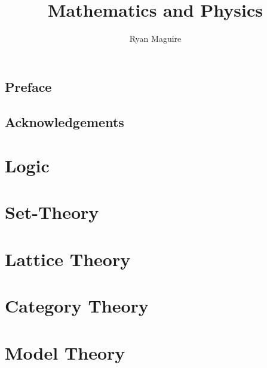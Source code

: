 \documentclass[oneside]{book}                                                  %
\title{Mathematics and Physics}                                                %
\author{Ryan Maguire}                                                          %
\date{\vspace{-5ex}}                                                           %
\newcommand*{\TOPPATH}{books}
\newcommand*{\PATH}{\TOPPATH/}
\newcounter{endpage}
\begin{document}
    \maketitle
    \tableofcontents
    \listoffigures
    \listoftables
    \clearpage
    \chapter*{Preface}
        
    \clearpage
    \chapter*{Acknowledgements}
        
    \clearpage

        \label{book:Foundations}
        \renewcommand{\PATH}{\TOPPATH/Foundations}
        \part{Logic}
            
        \part{Set-Theory}
            
        \part{Lattice Theory}
            
        \part{Category Theory}
            
        \part{Model Theory}
            
    \clearpage

    \setcounter{endpage}{\thepage}
        \label{book:Algebra}%
        \renewcommand{\PATH}{\TOPPATH/Algebra}
        \setcounter{page}{\value{endpage}}
\end{document}
